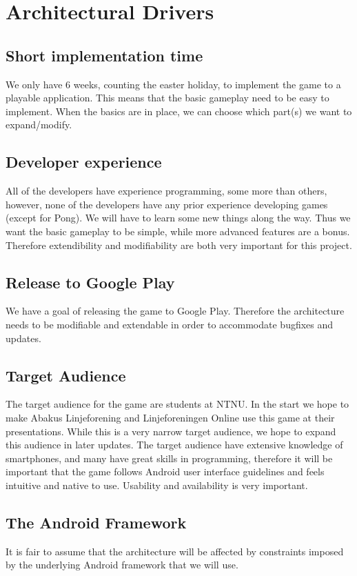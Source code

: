 \section{Architectural Drivers} 
\label{sec:architecturaldrivers}

\subsection{Short implementation time}
We only have 6 weeks, counting the easter holiday, to implement the game to a playable application. This means that the basic gameplay need to be easy to implement. When the basics are in place, we can choose which part(s) we want to expand/modify.

\subsection{Developer experience}
All of the developers have experience programming, some more than others, however, none of the developers have any prior experience developing games (except for Pong). We will have to learn some new things along the way. Thus we want the basic gameplay to be simple, while more advanced features are a bonus. Therefore extendibility and modifiability are both very important for this project.

\subsection{Release to Google Play}
We have a goal of releasing the game to Google Play. Therefore the architecture needs to be modifiable and extendable in order to accommodate bugfixes and updates. 

\subsection{Target Audience}
The target audience for the game are students at NTNU. In the start we hope to make Abakus Linjeforening and Linjeforeningen Online use this game at their presentations. While this is a very narrow target audience, we hope to expand this audience in later updates. The target audience have extensive knowledge of smartphones, and many have great skills in programming, therefore it will be important that the game follows Android user interface guidelines and feels intuitive and native to use. Usability and availability is very important.

\subsection{The Android Framework}
It is fair to assume that the architecture will be affected by constraints imposed by the underlying Android framework that we will use.
